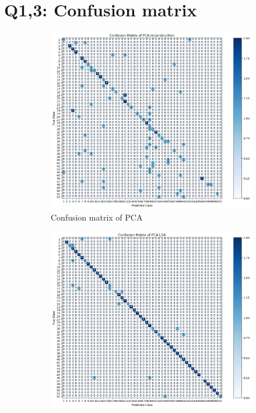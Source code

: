 \section{Q1,3: Confusion matrix}
\label{subsec:Q13_cm}
\begin{figure}[htbp]
	\centering
        \begin{subfigure}[t]{0.3\linewidth}
		\centering
	\includegraphics[width=\linewidth]{image/q1_cm.png}
	\caption{Confusion matrix of PCA}
	\label{fig:q1_cm}
        \end{subfigure}
    \quad
        \begin{subfigure}[t]{0.3\linewidth}
        \centering
        \includegraphics[width=\linewidth]{image/q3_1_cm.png} %

\end{subfigure}
\end{figure}
